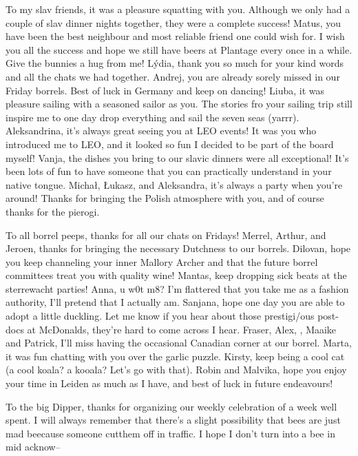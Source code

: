 \begin{thesisacknowledgements}
\begin{changemargin}{-1cm}{-1cm}
{    To my slav friends, it was a pleasure squatting with you. Although we only had a couple of slav dinner nights together, they were a complete success! Matus, you have been the best neighbour and most reliable friend one could wish for. I wish you all the success and hope we still have beers at Plantage every once in a while. Give the bunnies a hug from me! L\'ydia, thank you so much for your kind words and all the chats we had together. Andrej, you are already sorely missed in our Friday borrels. Best of luck in Germany and keep on dancing! Liuba, it was pleasure sailing with a seasoned sailor as you. The stories fro your sailing trip still inspire me to one day drop everything and sail the seven seas (yarrr). Aleksandrina, it's always great seeing you at LEO events! It was you who introduced me to LEO, and it looked so fun I decided to be part of the board myself! Vanja, the dishes you bring to our slavic dinners were all exceptional! It's been lots of fun to have someone that you can practically understand in your native tongue.  Micha\l{}, \L{}ukasz, and Aleksandra, it's always a party when you're around! Thanks for bringing the Polish atmosphere with you, and of course thanks for the pierogi.

    To all borrel peeps, thanks for all our chats on Fridays! Merrel, Arthur, and Jeroen, thanks for bringing the necessary Dutchness to our borrels. Dilovan, hope you keep channeling your inner Mallory Archer and that the future borrel committees treat you with quality wine! Mantas, keep dropping sick beats at the sterrewacht parties! Anna, u w0t m8? I'm flattered that you take me as a fashion authority, I'll pretend that I actually am. Sanjana, hope one day you are able to adopt a little duckling. Let me know if you hear about those prestigi/ous post-docs at McDonalds, they're hard to come across I hear. Fraser, Alex, , Maaike and Patrick, I'll miss having the occasional Canadian corner at our borrel. Marta, it was fun chatting with you over the garlic puzzle. Kirsty, keep being a cool cat (a cool koala? a kooala? Let's go with that). Robin and Malvika, hope you enjoy your time in Leiden as much as I have, and best of luck in future endeavours!

    To the big Dipper, thanks for organizing our weekly celebration of a week well spent. I will always remember that there's a slight possibility that bees  are just mad  beecause someone cutthem off in traffic. I hope I don't turn into a bee in mid acknow--

}
\end{changemargin}
\end{thesisacknowledgements}
